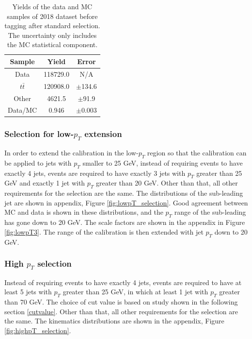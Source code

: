 \documentclass[letterpaper,12pt]{article}
\begin{document}
 \begin{table}[h]
 \begin{centering}
 \begin{tabular}{c|c|c}
          \hline
          \hline
Sample &  Yield & Error \\ \hline   \hline      
Data   & 118729.0& N/A\\ \hline
$t\bar{t}$  & 120908.0 &$\pm$134.6\\ \hline
Other  &   4621.5 &$\pm$91.9\\ \hline
Data/MC&  0.946   &$\pm$0.003\\ \hline

 \end{tabular} 
 \caption{Yields of the data and MC samples of 2018 dataset before tagging after standard selection. The uncertainty only includes the MC statistical component.} \label{tab:yields_standard}
 \end{centering}

 \end{table}








\subsubsection{Selection for low-$p_{T}$ extension}
In order to extend the calibration in the low-$p_{T}$ region so that the calibration can be applied to jets with $p_{T}$ smaller to 25 GeV, instead of requiring events to have exactly 4 jets, events are required to have exactly 3 jets with $p_{T}$ greater than 25 GeV and exactly 1 jet with $p_{T}$ greater than 20 GeV. Other than that, all other requirements for the selection are the same. The distributions of the sub-leading jet are shown in appendix, Figure \ref{fig:lowpT_selection}. Good agreement between MC and data is shown in these distributions, and the $p_{T}$ range of the sub-leading has gone down to 20 GeV. The scale factors are shown in the appendix in Figure \ref{fig:lowpT3}. The range of the calibration is then extended with jet $p_{T}$ down to 20 GeV. 




\subsubsection{High $p_T$ selection}
\label{high_pt_selection}
Instead of requiring events to have exactly 4 jets, events are required to have at least 5 jets with $p_{T}$ greater than 25 GeV, in which at least 1 jet with $p_{T}$ greater than 70 GeV. The choice of cut value is based on study shown in the following section \ref{cutvalue}. Other than that, all other requirements for the selection are the same.  The kinematics distributions are shown in the appendix, Figure \ref{fig:highpT_selection}. 
\end{document}
